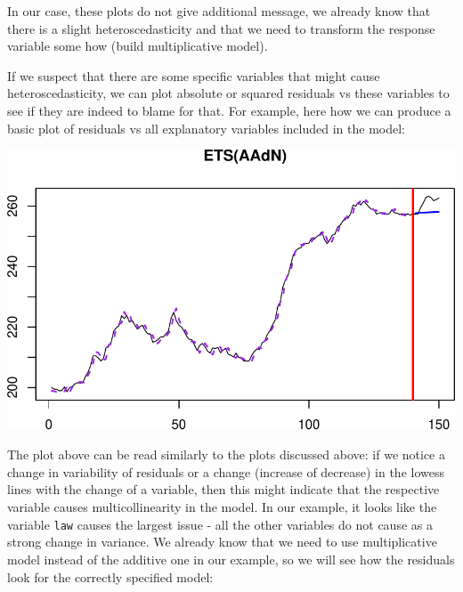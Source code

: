 \documentclass[
]{book}
\newenvironment{Shaded}{\begin{snugshade}}{\end{snugshade}}
\newcommand{\AttributeTok}[1]{\textcolor[rgb]{0.77,0.63,0.00}{#1}}
\newcommand{\ConstantTok}[1]{\textcolor[rgb]{0.00,0.00,0.00}{#1}}
\newcommand{\DecValTok}[1]{\textcolor[rgb]{0.00,0.00,0.81}{#1}}
\newcommand{\FunctionTok}[1]{\textcolor[rgb]{0.00,0.00,0.00}{#1}}
\newcommand{\NormalTok}[1]{#1}
\newcommand{\SpecialCharTok}[1]{\textcolor[rgb]{0.00,0.00,0.00}{#1}}
\theoremstyle{definition}
\theoremstyle{definition}
\theoremstyle{definition}
\theoremstyle{definition}
\theoremstyle{remark}
\begin{document}
In our case, these plots do not give additional message, we already know that there is a slight heteroscedasticity and that we need to transform the response variable some how (build multiplicative model).

If we suspect that there are some specific variables that might cause heteroscedasticity, we can plot absolute or squared residuals vs these variables to see if they are indeed to blame for that. For example, here how we can produce a basic plot of residuals vs all explanatory variables included in the model:

\begin{Shaded}
\end{Shaded}

\includegraphics{adam_files/figure-latex/unnamed-chunk-157-1.pdf}

The plot above can be read similarly to the plots discussed above: if we notice a change in variability of residuals or a change (increase of decrease) in the lowess lines with the change of a variable, then this might indicate that the respective variable causes multicollinearity in the model. In our example, it looks like the variable \texttt{law} causes the largest issue - all the other variables do not cause as a strong change in variance. We already know that we need to use multiplicative model instead of the additive one in our example, so we will see how the residuals look for the correctly specified model:
\end{document}
